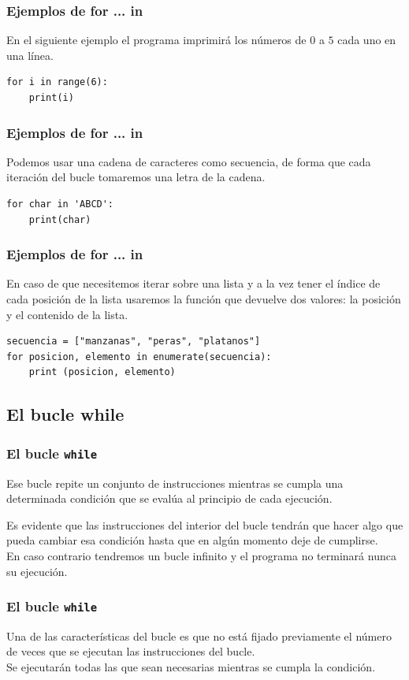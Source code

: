 \begin{frame}[fragile]
\frametitle{Ejemplos de for ... in}
En el siguiente ejemplo el programa imprimirá los números de $0$ a $5$ cada uno en una línea.
\begin{lstlisting}[numbers=none, basicstyle=\linespread{1.2}\ttfamily\small, columns=fullflexible]
for i in range(6):
    print(i)
\end{lstlisting}
\end{frame}
\begin{frame}[fragile]
\frametitle{Ejemplos de for ... in}
Podemos usar una cadena de caracteres como secuencia, de forma que cada iteración del bucle tomaremos una letra de la cadena.
\begin{lstlisting}[numbers=none, basicstyle=\linespread{1.2}\ttfamily\small, columns=fullflexible]
for char in 'ABCD':
    print(char)
\end{lstlisting}
\end{frame}
\begin{frame}[fragile]
\frametitle{Ejemplos de for ... in}
En caso de que necesitemos iterar sobre una lista y a la vez tener el índice de cada posición de la lista usaremos la función  que devuelve dos valores: la posición y el contenido de la lista.
\begin{lstlisting}[numbers=none, basicstyle=\linespread{1.2}\ttfamily\small, columns=fullflexible]
secuencia = ["manzanas", "peras", "platanos"]
for posicion, elemento in enumerate(secuencia):
    print (posicion, elemento)
\end{lstlisting}
\end{frame}
\subsection{El bucle while}
\begin{frame}
\frametitle{El bucle \texttt{while}}
Ese bucle repite un conjunto de instrucciones mientras se cumpla una determinada condición que se evalúa al principio de cada ejecución.
\end{frame}
\begin{frame}
Es evidente que las instrucciones del interior del bucle tendrán que hacer algo que pueda cambiar esa condición hasta que en algún momento deje de cumplirse.
\\
\bigskip
En caso contrario tendremos un bucle infinito y el programa no terminará nunca su ejecución.
\end{frame}
\begin{frame}
\frametitle{El bucle \texttt{while}}
Una de las características del bucle  es que no está fijado previamente el número de veces que se ejecutan las instrucciones del bucle.
\\
\bigskip
Se ejecutarán todas las que sean necesarias mientras se cumpla la condición.
\end{frame}

